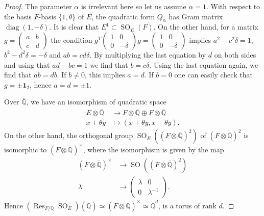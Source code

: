 \documentclass[11pt]{article} %
\newcommand{\8}{\infty}
\newcommand{\id}{\mathbf{1}}
\newcommand{\Qbar}{\overline{\Q}}
\newcommand{\diag}{\operatorname{diag}}
\newcommand{\SO}{\operatorname{SO}}
\newcommand{\Q}{\mathbb{Q}}
\newcommand{\Res}{\operatorname{Res}}
\theoremstyle{mytheoremstyle}
\theoremstyle{remark}
\numberwithin{equation}{section}
\begin{document}
\begin{proof}
    The parameter $\alpha$ is irrelevant here so let us assume $\alpha=1$. With respect to the basis $F$-basis $\{1,\theta\}$ of $E$, the quadratic form $Q_\alpha$ has Gram matrix $\diag(1,-\delta)$. It is clear that $E^1 \subset \SO_E(F)$. On the other hand, for a matrix $g=\begin{pmatrix} a & b \\ c & d    
\end{pmatrix}
$ the condition $g^T\begin{pmatrix}
        1 & 0 \\ 0 & -\delta
\end{pmatrix}g=\begin{pmatrix}
        1 & 0 \\ 0 & -\delta
\end{pmatrix}$ implies $a^2-c^2\delta=1$, $b^2-d^2\delta=-\delta$ and $ab=cd\delta.$
By multiplying the last equation by $d$ on both sides and using that $ad-bc=1$ we find that $b=c\delta$. Using the last equation again, we find that $ab=db$. If $b \neq 0$, this implies $a=d$. If $b=0$ one can easily check that $g=\pm \id_2$, hence $a=d=\pm 1$.

Over $\Qbar$, we have an isomorphism of quadratic space
\begin{align}
    E \otimes \Qbar & \longrightarrow F \otimes \Qbar \oplus F \otimes \Qbar \nonumber \\
    x+\theta y & \longmapsto (x+\theta y, x-\theta y).
\end{align}
On the other hand, the orthogonal group $\SO_E((F \otimes \Qbar)^2)$ of $(F \otimes \Qbar)^2$ is isomorphic to $(F \otimes \Qbar)^\times$, where the isomorphism is given by the map
\begin{align}
    (F \otimes \Qbar)^\times & \longrightarrow \SO((F \otimes \Qbar)^2) \nonumber \\
    \lambda & \longrightarrow \begin{pmatrix}
        \lambda & 0 \\ 0 & \lambda^{-1}
    \end{pmatrix}.
\end{align}
Hence $(\Res_{F/\Q} \SO_E)(\Qbar) \simeq (F \otimes \Qbar)^\times \simeq \Qbar^{d}$, is a torus of rank $d$.
\end{proof}
\end{document}
